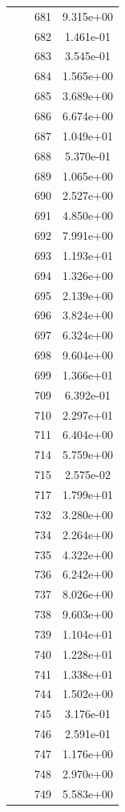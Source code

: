 \documentclass[12pt]{article}
\begin{document}
\begin{longtable}{@{}cccc@{}}
 &  & 681 & 9.315e+00 \\
 &  & 682 & 1.461e-01 \\
 &  & 683 & 3.545e-01 \\
 &  & 684 & 1.565e+00 \\
 &  & 685 & 3.689e+00 \\
 &  & 686 & 6.674e+00 \\
 &  & 687 & 1.049e+01 \\
 &  & 688 & 5.370e-01 \\
 &  & 689 & 1.065e+00 \\
 &  & 690 & 2.527e+00 \\
 &  & 691 & 4.850e+00 \\
 &  & 692 & 7.991e+00 \\
 &  & 693 & 1.193e+01 \\
 &  & 694 & 1.326e+00 \\
 &  & 695 & 2.139e+00 \\
 &  & 696 & 3.824e+00 \\
 &  & 697 & 6.324e+00 \\
 &  & 698 & 9.604e+00 \\
 &  & 699 & 1.366e+01 \\
 &  & 709 & 6.392e-01 \\
 &  & 710 & 2.297e+01 \\
 &  & 711 & 6.404e+00 \\
 &  & 714 & 5.759e+00 \\
 &  & 715 & 2.575e-02 \\
 &  & 717 & 1.799e+01 \\
 &  & 732 & 3.280e+00 \\
 &  & 734 & 2.264e+00 \\
 &  & 735 & 4.322e+00 \\
 &  & 736 & 6.242e+00 \\
 &  & 737 & 8.026e+00 \\
 &  & 738 & 9.603e+00 \\
 &  & 739 & 1.104e+01 \\
 &  & 740 & 1.228e+01 \\
 &  & 741 & 1.338e+01 \\
 &  & 744 & 1.502e+00 \\
 &  & 745 & 3.176e-01 \\
 &  & 746 & 2.591e-01 \\
 &  & 747 & 1.176e+00 \\
 &  & 748 & 2.970e+00 \\
 &  & 749 & 5.583e+00 \\

\end{longtable}
\end{document}
